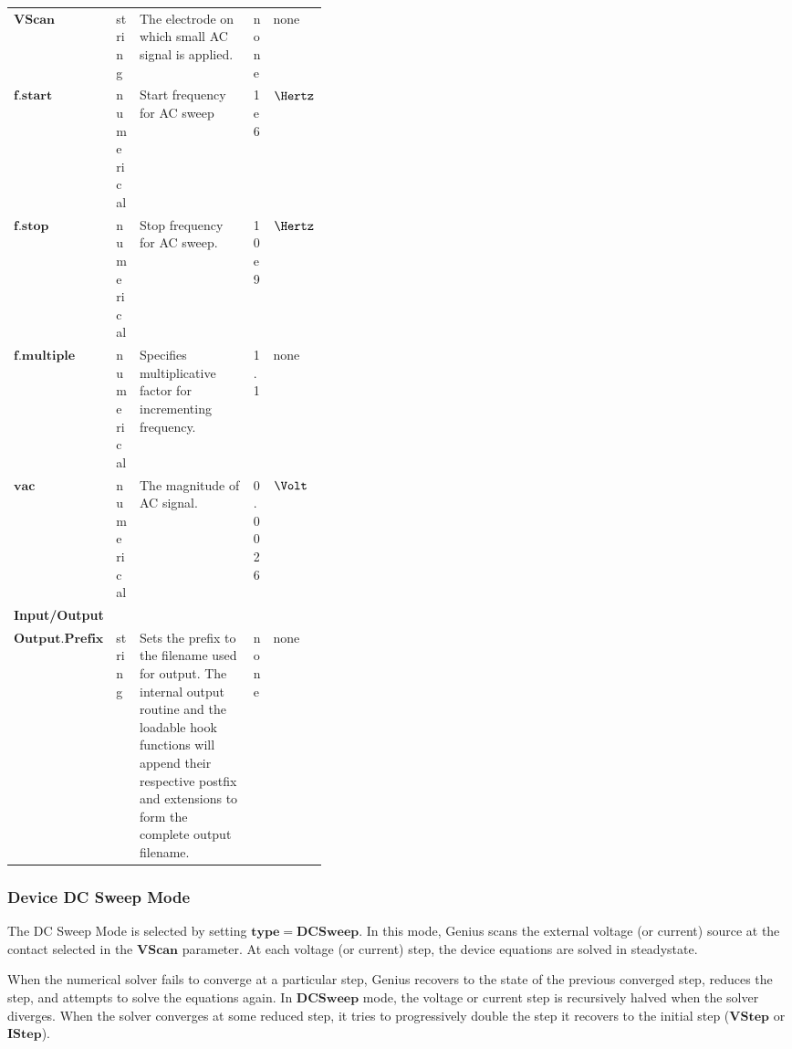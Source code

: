 \documentclass[oneside,12pt]{cgd_book}
\begin{document}
\begin{longtable}{ll>{\raggedright}p{0.4\linewidth}ll}
\\
 $\mathbf{VScan}$
& string
& The electrode on which small AC signal is applied.
& none
& none
\\
 $\mathbf{f.start}$
& numerical
& Start frequency for AC sweep
& 1e6
& $\Hertz$
\\
 $\mathbf{f.stop}$
& numerical
& Stop frequency for AC sweep.
& 10e9
& $\Hertz$
\\
 $\mathbf{f.multiple}$
& numerical
& Specifies multiplicative factor for incrementing frequency.
& 1.1
& none
\\
 $\mathbf{vac}$
& numerical
& The magnitude of AC signal.
& 0.0026
& $\Volt$\\
\multicolumn{5}{l}{\textbf{Input/Output}}
\\
 $\mathbf{Output.Prefix}$
& string
& Sets the prefix to the filename used for output. The internal output routine and the loadable
                  hook functions will append their respective postfix and extensions to form the complete output
                  filename.
& none
& none\\
\end{longtable}

\subsubsection{Device DC Sweep Mode}
The DC Sweep Mode is selected by setting $\mathbf{type=DCSweep}$. In this mode, Genius scans
          the external voltage (or current) source at the contact selected in the
$\mathbf{VScan}$ parameter. At each voltage (or current) step, the device equations are solved in steadystate.
\par
{}When the numerical solver fails to converge at a particular step, Genius recovers to the state of the
            previous converged step, reduces the step, and attempts to solve the equations again. In
$\mathbf{DCSweep}$ mode, the voltage or current step is recursively halved when the solver
            diverges. When the solver converges at some reduced step, it tries to progressively double the step it
            recovers to the initial step ($\mathbf{VStep}$ or $\mathbf{IStep}$).
\par
\par
\end{document}
